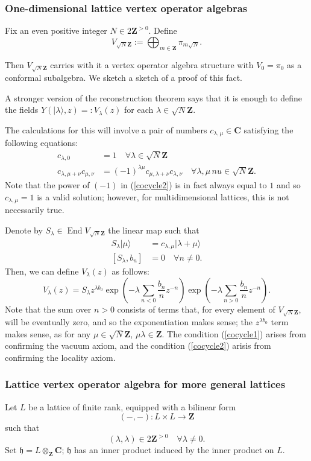 \documentclass{article}
\newcommand{\CC}{\mathbold{C}}
\newcommand{\ZZ}{\mathbold{Z}}
\newcommand{\hh}{\mathfrak{h}}
\DeclareMathOperator{\End}{End}
\begin{document}
\subsubsection{One-dimensional lattice vertex operator algebras}
Fix an even positive integer $N \in 2\ZZ^{>0}$.  Define
\[V_{\sqrt{N}\ZZ}:=\bigoplus_{m \in \ZZ}\pi_{m\sqrt{N}}. \]

Then $V_{\sqrt{N}\ZZ}$ carries with it a vertex operator algebra structure with $V_0=\pi_0$ as a conformal subalgebra.  We sketch a sketch of a proof of this fact.

A stronger version of the reconstruction theorem says that it is enough to define the fields $Y(|\lambda\rangle,z)=:V_\lambda(z)$ for each $\lambda \in \sqrt{N}\ZZ$.

The calculations for this will involve a pair of numbers $c_{\lambda,\mu} \in \CC$ satisfying the following equations:
\begin{align}
  c_{\lambda,0}&=1 \quad \forall \lambda \in \sqrt{N}\ZZ \label{cocycle1} \\
  c_{\lambda,\mu+\nu}c_{\mu,\nu}&=(-1)^{\lambda\mu}c_{\mu,\lambda+\nu}c_{\lambda,\nu}\quad \forall \lambda,\mu\,nu \in \sqrt{N}\ZZ.\label{cocycle2}
\end{align}
Note that the power of $(-1)$ in (\ref{cocycle2}) is in fact always equal to $1$ and so $c_{\lambda,\mu}=1$ is a valid solution; however, for multidimensional lattices, this is not necessarily true.

Denote by $S_\lambda \in \End V_{\sqrt{N}\ZZ}$ the linear map such that
\begin{align}
  S_\lambda|\mu\rangle &= c_{\lambda,\mu}|\lambda+\mu\rangle\\
  [S_\lambda,b_n] &= 0 \quad \forall n \ne 0.
\end{align}
Then, we can define $V_\lambda(z)$ as follows:
\[
V_\lambda(z)=S_\lambda z^{\lambda b_0}\exp{\left(-\lambda\sum_{n<0}\frac{b_n}{n}z^{-n} \right)} \exp{\left(-\lambda\sum_{n>0}\frac{b_n}{n} z^{-n}\right)}.
\]
Note that the sum over $n>0$ consists of terms that, for every element of $V_{\sqrt{N}\ZZ}$, will be eventually zero, and so the exponentiation makes sense; the $z^{\lambda b_0}$ term makes sense, as for any $\mu \in \sqrt{N}\ZZ$, $\mu\lambda \in \ZZ$.  The condition (\ref{cocycle1}) arises from confirming the vacuum axiom, and the condition (\ref{cocycle2}) arisis from confirming the locality axiom.
\subsubsection{Lattice vertex operator algebra for more general lattices}
Let $L$ be a lattice of finite rank, equipped with a bilinear form
\[(-,-):L \times L \rightarrow \ZZ \]
such that
\[(\lambda,\lambda)\in 2\ZZ^{>0} \quad \forall \lambda \ne 0. \]
Set $\hh=L \otimes_\ZZ \CC$; $\hh$ has an inner product induced by the inner product on $L$.
\end{document}

